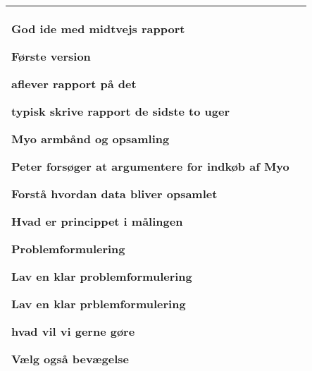 \begin{center}
\begin{tabular}{| l | p{10cm} |}
\begin{myEnumerate}
\begin{myItemize}
\begin{myItemize}
				\end{myItemize}
				\item God ide med midtvejs rapport
				\begin{myItemize}
					\item Første version
					\item aflever rapport på det
				\end{myItemize}
				\item typisk skrive rapport de sidste to uger
			\end{myItemize}
			\item Myo armbånd og opsamling 
			\begin{myItemize}
				\item Peter forsøger at argumentere for indkøb af Myo
				\item Forstå hvordan data bliver opsamlet
				\item Hvad er princippet i målingen
			\end{myItemize}
			\item Problemformulering
			\begin{myItemize}
				\item Lav en klar problemformulering
				\begin{myItemize}
					\item Lav en klar prblemformulering
					\item hvad vil vi gerne gøre
					\item Vælg også bevægelse
				\end{myItemize}
			\end{myItemize}
			\end{myEnumerate}\\  	
		\hline
	\end{tabular}
\end{center}

